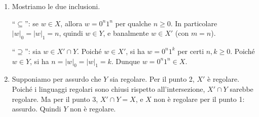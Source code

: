 \begin{sol}
\begin{enumerate}
\[\begin{tikzpicture}[
    >=stealth', shorten >=1pt, auto,
    every state/.style={circle, draw, fill=white, minimum size=0.8cm, inner sep=1pt}
]
\draw[->] ([shift={(-0.7,0.7)}]q0s.center) -- (q0s);
\draw[->, very thick] (q0s) -- node {$\varepsilon+00^*+00^*11^*+11^*$} (qF);
\end{tikzpicture}
\]
L'espressione ottenuta si riduce a $\varepsilon+0^*1^*$, ma anche più semplicemente a $0^*1^*$: infatti $\varepsilon+00^*+00^*11^*+11^*=\varepsilon+00^*1^*+11^*=0^*1^*$. Quindi $X'$ è l'interpretazione di $0^*1^*$ ed è regolare.

\item Mostriamo le due inclusioni.

``$\subseteq$'': se $w\in X$, allora $w=0^n1^n$ per qualche $n\geq 0$. In particolare $|w|_0=|w|_1=n$, quindi $w\in Y$, e banalmente $w\in X'$ (con $m=n$).

``$\supseteq$'': sia $w\in X'\cap Y$. Poiché $w\in X'$, si ha $w=0^n1^k$ per certi $n,k\geq 0$. Poiché $w\in Y$, si ha $n=|w|_0=|w|_1=k$. Dunque $w=0^n1^n\in X$.

\item Supponiamo per assurdo che $Y$ sia regolare. Per il punto 2, $X'$ è regolare. Poiché i linguaggi regolari sono chiusi rispetto all'intersezione, $X'\cap Y$ sarebbe regolare. Ma per il punto 3, $X'\cap Y=X$, e $X$ non è regolare per il punto 1: assurdo. Quindi $Y$ non è regolare.
\end{enumerate}
\end{sol}